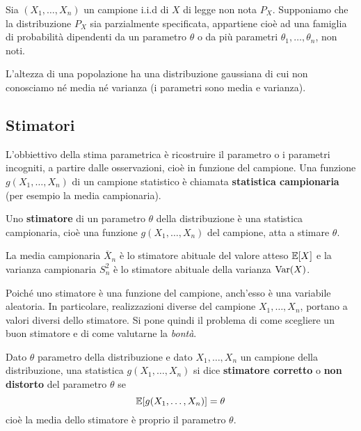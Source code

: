 Sia $(X_1, \dots, X_n)$ un campione i.i.d di $X$ di legge non nota $P_X$. Supponiamo che la
distribuzione $P_X$ sia parzialmente specificata, appartiene cioè ad una famiglia di probabilità
dipendenti da un parametro $\theta$ o da più parametri $\theta_1, \dots, \theta_n$, non noti.

\begin{example}
	L'altezza di una popolazione ha una distribuzione gaussiana di cui non conosciamo né media né
	varianza (i parametri sono media e varianza).
\end{example}

\subsection{Stimatori}\label{def: stimatore}
L'obbiettivo della stima parametrica è ricostruire il parametro o i parametri incogniti, a partire
dalle osservazioni, cioè in funzione del campione. Una funzione $g(X_1, \dots, X_n)$ di un campione
statistico è chiamata \textbf{statistica campionaria} (per esempio la media campionaria).

Uno \textbf{stimatore} di un parametro $\theta$ della distribuzione è una statistica campionaria,
cioè una funzione $g(X_1, \dots, X_n)$ del campione, atta a stimare $\theta$.

\begin{example}
	La media campionaria $\overline{X}_n$ è lo stimatore abituale del valore atteso $\mathbb{E}[X]$ e la
	varianza campionaria $S_n^2$ è lo stimatore abituale della varianza $\operatorname{Var}(X)$.
\end{example}

Poiché uno stimatore è una funzione del campione, anch'esso è una variabile aleatoria. In
particolare, realizzazioni diverse del campione $X_1, \dots, X_n$, portano a valori diversi dello
stimatore. Si pone quindi il problema di come scegliere un buon stimatore e di come valutarne la
\emph{bontà}.

\begin{definition}\label{def: stimatore corretto}
	Dato $\theta$ parametro della distribuzione e dato $X_1, \dots, X_n$ un campione della
	distribuzione, una statistica $g(X_1, \dots, X_n)$ si dice \textbf{stimatore corretto} o
	\textbf{non distorto} del parametro $\theta$ se
	\[ \mathbb{E}[g(X_1, \dots, X_n)] = \theta \]
	cioè la media dello stimatore è proprio il parametro $\theta$.
\end{definition}

